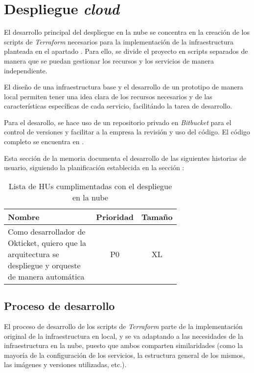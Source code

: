 \section{Despliegue \textit{cloud}}\label{sec:impl_cloud}
El desarrollo principal del despliegue en la nube se concentra en la creación
de los scripts de \textit{Terraform} necesarios para la implementación de la
infraestructura planteada en el apartado . Para ello,
se divide el proyecto en scripts separados de manera que se puedan gestionar
los recursos y los servicios de manera independiente.

El diseño de una infraestructura base y el desarrollo de un prototipo de manera
local permiten tener una idea clara de los recursos necesarios y de las
características específicas de cada servicio, facilitándo la tarea de
desarrollo.

Para el desarollo, se hace uso de un repositorio privado en \textit{Bitbucket}
para el control de versiones y facilitar a la empresa la revisión y uso del
código. El código completo se encuentra en .

Esta sección de la memoria documenta el desarrollo de las siguientes historias
de usuario, siguiendo la planificación establecida en la sección :

\begin{table}[H]
	\centering
	\begin{tabular}{|p{0.7\linewidth}|c|c|}
		\hline
		\textbf{Nombre} & \textbf{Prioridad} & \textbf{Tamaño} \\
		\hline
		\hline
		Como desarrollador de Okticket, quiero que la arquitectura se despliegue y orqueste de manera automática & P0\cellcolor{red!50} & XL\cellcolor{red!50} \\
		\hline
  \end{tabular}
  \caption{Lista de HUs cumplimentadas con el despliegue en la nube}
  \label{tab:impl_cloud}
\end{table}


\newpage{}
\subsection{Proceso de desarrollo}\label{subsec:impl_cloud_desarrollo}
El proceso de desarrollo de los scripts de \textit{Terraform} parte de la
implementación original de la infraestructura en local, y se va adaptando a
las necesidades de la infraestructura en la nube, puesto que ambos comparten
similaridades (como la mayoría de la configuración de los servicios, la
estructura general de los mismos, las imágenes y versiones utilizadas, etc.).


